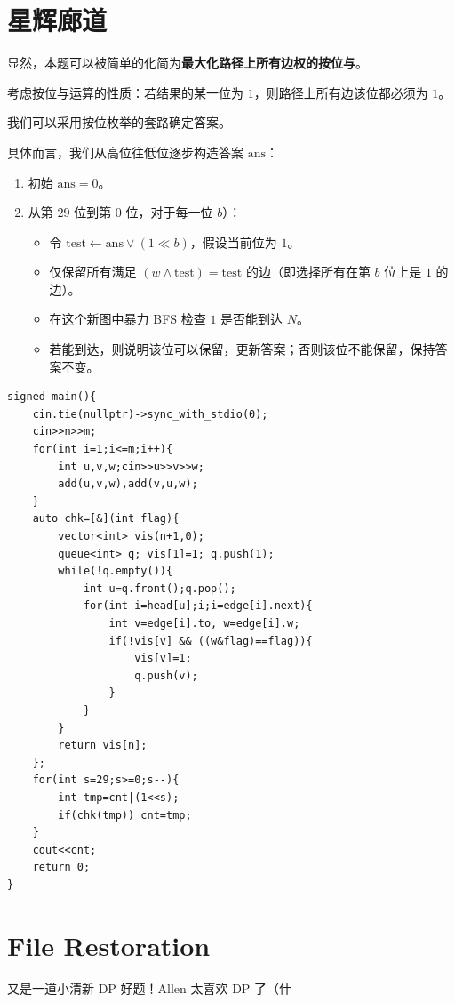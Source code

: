 \documentclass[14pt,a4paper]{article}
\begin{document}
\section{星辉廊道}
显然，本题可以被简单的化简为\textbf{最大化路径上所有边权的按位与}。

\begin{hintbox}
考虑按位与运算的性质：若结果的某一位为 $1$，则路径上所有边该位都必须为 $1$。
\end{hintbox}

我们可以采用按位枚举的套路确定答案。

具体而言，我们从高位往低位逐步构造答案 $\text{ans}$：

\begin{enumerate}
  \item 初始 $\text{ans}=0$。
  \item 从第 $29$ 位到第 $0$ 位，对于每一位 $b$）：
  \begin{itemize}
  \item 令 $\text{test} \leftarrow \text{ans} \lor (1 \ll b)$，假设当前位为 $1$。
  \item 仅保留所有满足 $(w \land \text{test}) = \text{test}$ 的边（即选择所有在第 $b$ 位上是 $1$ 的边）。
  \item 在这个新图中暴力 BFS 检查 $1$ 是否能到达 $N$。
  \item 若能到达，则说明该位可以保留，更新答案；否则该位不能保留，保持答案不变。
  \end{itemize}
\end{enumerate}

\begin{verbatim}
signed main(){
    cin.tie(nullptr)->sync_with_stdio(0);
    cin>>n>>m;
    for(int i=1;i<=m;i++){
        int u,v,w;cin>>u>>v>>w;
        add(u,v,w),add(v,u,w);
    }
    auto chk=[&](int flag){
        vector<int> vis(n+1,0);
        queue<int> q; vis[1]=1; q.push(1);
        while(!q.empty()){
            int u=q.front();q.pop();
            for(int i=head[u];i;i=edge[i].next){
                int v=edge[i].to, w=edge[i].w;
                if(!vis[v] && ((w&flag)==flag)){
                    vis[v]=1;
                    q.push(v);
                }
            }
        }
        return vis[n];
    };
    for(int s=29;s>=0;s--){
        int tmp=cnt|(1<<s);
        if(chk(tmp)) cnt=tmp;
    }
    cout<<cnt;
    return 0;
}
\end{verbatim}

\section{File Restoration}
又是一道小清新 DP 好题！Allen 太喜欢 DP 了（什
\end{document}
